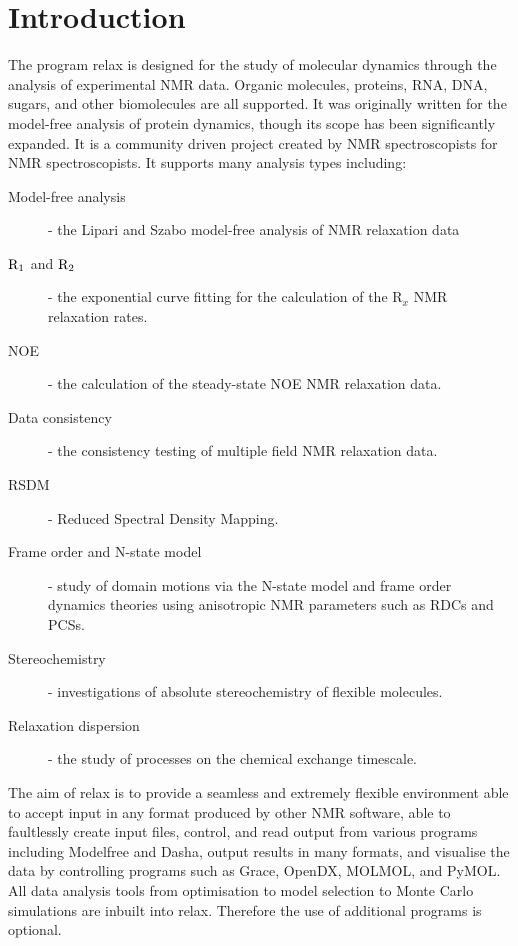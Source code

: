 
\chapter{Introduction}

The program relax is designed for the study of molecular dynamics through the analysis of experimental NMR data. Organic molecules, proteins, RNA, DNA, sugars, and other biomolecules are all supported. It was originally written for the model-free analysis of protein dynamics, though its scope has been significantly expanded.  It is a community driven project created by NMR spectroscopists for NMR spectroscopists.  It supports many analysis types including:

\begin{description}
\item[Model-free analysis] - the Lipari and Szabo model-free analysis of NMR relaxation data
\item[$\mathrm{R}_1$ and $\mathrm{R}_2$] - the exponential curve fitting for the calculation of the R$_x$ NMR relaxation rates.
\item[NOE] - the calculation of the steady-state NOE NMR relaxation data.
\item[Data consistency] - the consistency testing of multiple field NMR relaxation data.
\item[RSDM] - Reduced Spectral Density Mapping.
\item[Frame order and N-state model] - study of domain motions via the N-state model and frame order dynamics theories using anisotropic NMR parameters such as RDCs and PCSs.
\item[Stereochemistry] - investigations of absolute stereochemistry of flexible molecules.
\item[Relaxation dispersion] - the study of processes on the chemical exchange timescale.
\end{description}

The aim of relax is to provide a seamless and extremely flexible environment able to accept input in any format produced by other NMR software, able to faultlessly create input files, control, and read output from various programs including Modelfree and Dasha, output results in many formats, and visualise the data by controlling programs such as Grace, OpenDX, MOLMOL, and PyMOL.  All data analysis tools from optimisation to model selection to Monte Carlo simulations are inbuilt into relax. Therefore the use of additional programs is optional.

